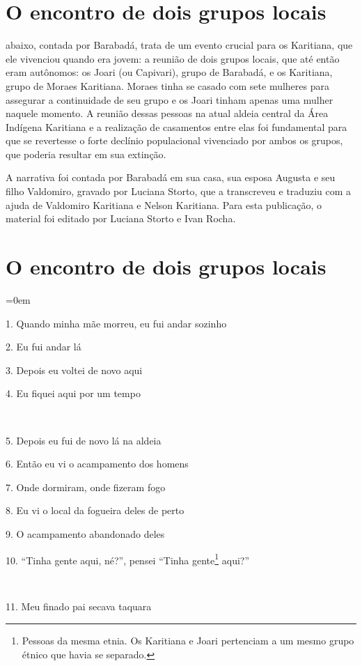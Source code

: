 \chapter{O encontro de dois grupos locais}

 abaixo, contada por Barabadá, trata de um evento crucial para
os Karitiana, que ele vivenciou quando era jovem: a reunião de dois
grupos locais, que até então eram autônomos: os Joari (ou Capivari),
grupo de Barabadá, e os Karitiana, grupo de Moraes Karitiana. Moraes
tinha se casado com sete mulheres para assegurar a continuidade de seu
grupo e os Joari tinham apenas uma mulher naquele momento. A reunião
dessas pessoas na atual aldeia central da Área Indígena Karitiana e a
realização de casamentos entre elas foi fundamental para que se
revertesse o forte declínio populacional vivenciado por ambos os grupos,
que poderia resultar em sua extinção.

A narrativa foi contada por Barabadá em sua casa, sua esposa Augusta e
seu filho Valdomiro, gravado por Luciana Storto, que a transcreveu e
traduziu com a ajuda de Valdomiro Karitiana e Nelson Karitiana. Para
esta publicação, o material foi editado por Luciana Storto e Ivan Rocha.

\chapter*{O encontro de dois grupos locais}\parindent=0em

1. Quando minha mãe morreu, eu fui andar sozinho

2. Eu fui andar lá

3. Depois eu voltei de novo aqui

4. Eu fiquei aqui por um tempo

~

5. Depois eu fui de novo lá na aldeia

6. Então eu vi o acampamento dos homens

7. Onde dormiram, onde fizeram fogo

8. Eu vi o local da fogueira deles de perto

9. O acampamento abandonado deles

10. ``Tinha gente aqui, né?'', pensei ``Tinha gente\footnote{Pessoas da
  mesma etnia.  Os Karitiana e Joari pertenciam a um mesmo grupo étnico
  que havia se separado.} aqui?''

~

11. Meu finado pai secava taquara

